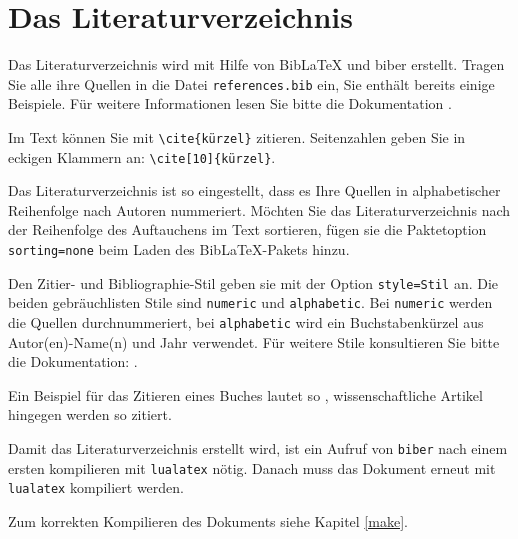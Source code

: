 \section{Das Literaturverzeichnis}

Das Literaturverzeichnis wird mit Hilfe von BibLaTeX und biber erstellt.
Tragen Sie alle ihre Quellen in die Datei \texttt{references.bib} ein, Sie enthält bereits
einige Beispiele. Für weitere Informationen lesen Sie bitte die Dokumentation \cite{biblatex}.

Im Text können Sie mit \verb_\cite{kürzel}_ zitieren. Seitenzahlen geben Sie in eckigen Klammern an:
\verb_\cite[10]{kürzel}_. 

Das Literaturverzeichnis ist so eingestellt, dass es Ihre Quellen in alphabetischer Reihenfolge nach Autoren nummeriert.
Möchten Sie das Literaturverzeichnis nach der Reihenfolge des Auftauchens im Text sortieren, fügen sie die Paktetoption \texttt{sorting=none} beim Laden
des BibLaTeX-Pakets hinzu.

Den Zitier- und Bibliographie-Stil geben sie mit der Option \texttt{style=Stil} an. Die beiden gebräuchlisten Stile sind \texttt{numeric} und \texttt{alphabetic}. 
Bei \texttt{numeric} werden die Quellen durchnummeriert, bei \texttt{alphabetic} wird ein Buchstabenkürzel aus Autor(en)-Name(n) und Jahr verwendet.
Für weitere Stile konsultieren Sie bitte die Dokumentation: \cite{biblatex}.

Ein Beispiel für das Zitieren eines Buches lautet so \cite{handbook_adhesives},
wissenschaftliche Artikel hingegen werden so \cite{einstein} zitiert.

Damit das Literaturverzeichnis erstellt wird, ist ein Aufruf von \texttt{biber} nach einem ersten kompilieren mit \texttt{lualatex} nötig.
Danach muss das Dokument erneut mit \texttt{lualatex} kompiliert werden. 

Zum korrekten Kompilieren des Dokuments siehe Kapitel \ref{make}.
